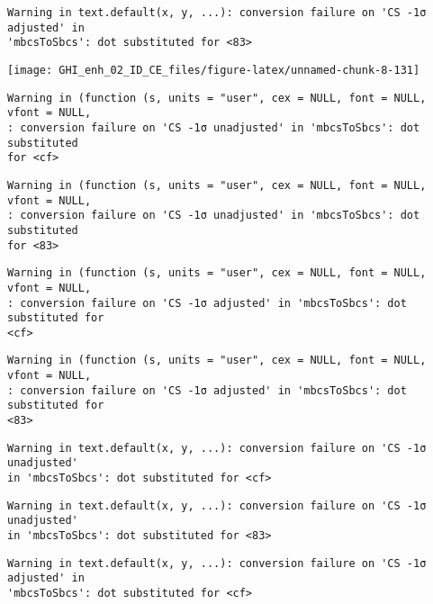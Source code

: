 \documentclass[
  10pt,
  a4paper,oneside]{article}
\begin{document}
\begin{verbatim}
Warning in text.default(x, y, ...): conversion failure on 'CS -1σ adjusted' in
'mbcsToSbcs': dot substituted for <83>
\end{verbatim}

\begin{center}\texttt{[image: GHI\_enh\_02\_ID\_CE\_files/figure-latex/unnamed-chunk-8-131]} \end{center}

\begin{verbatim}
Warning in (function (s, units = "user", cex = NULL, font = NULL, vfont = NULL,
: conversion failure on 'CS -1σ unadjusted' in 'mbcsToSbcs': dot substituted
for <cf>
\end{verbatim}

\begin{verbatim}
Warning in (function (s, units = "user", cex = NULL, font = NULL, vfont = NULL,
: conversion failure on 'CS -1σ unadjusted' in 'mbcsToSbcs': dot substituted
for <83>
\end{verbatim}

\begin{verbatim}
Warning in (function (s, units = "user", cex = NULL, font = NULL, vfont = NULL,
: conversion failure on 'CS -1σ adjusted' in 'mbcsToSbcs': dot substituted for
<cf>
\end{verbatim}

\begin{verbatim}
Warning in (function (s, units = "user", cex = NULL, font = NULL, vfont = NULL,
: conversion failure on 'CS -1σ adjusted' in 'mbcsToSbcs': dot substituted for
<83>
\end{verbatim}

\begin{verbatim}
Warning in text.default(x, y, ...): conversion failure on 'CS -1σ unadjusted'
in 'mbcsToSbcs': dot substituted for <cf>
\end{verbatim}

\begin{verbatim}
Warning in text.default(x, y, ...): conversion failure on 'CS -1σ unadjusted'
in 'mbcsToSbcs': dot substituted for <83>
\end{verbatim}

\begin{verbatim}
Warning in text.default(x, y, ...): conversion failure on 'CS -1σ adjusted' in
'mbcsToSbcs': dot substituted for <cf>
\end{verbatim}
\end{document}
